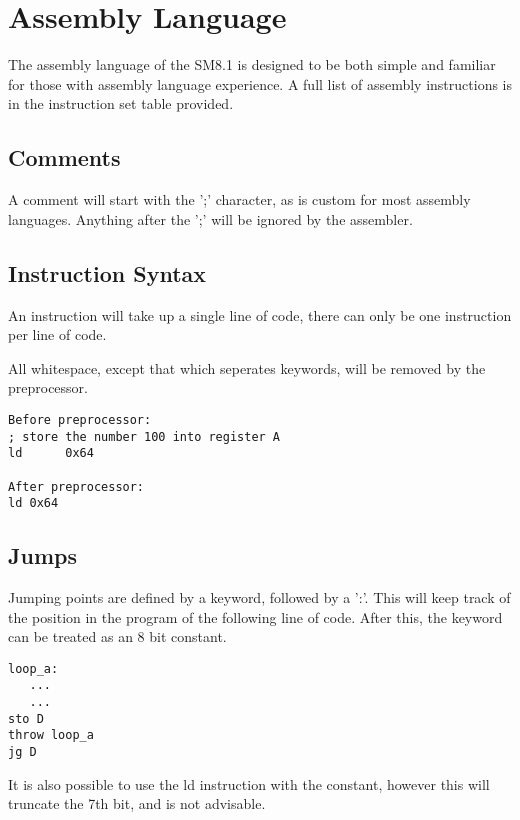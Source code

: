 \documentclass[11pt]{article}
\begin{document}
\section{Assembly Language}
The assembly language of the SM8.1 is designed to be both simple and familiar for those with assembly language experience. A full list of assembly instructions is in the instruction set table provided.
\newpage
\subsection{Comments}
A comment will start with the ';' character, as is custom for most assembly languages. Anything after the ';' will be ignored by the assembler.
\subsection{Instruction Syntax}
An instruction will take up a single line of code, there can only be one instruction per line of code.

All whitespace, except that which seperates keywords, will be removed by the preprocessor.
\begin{verbatim}
Before preprocessor:
; store the number 100 into register A
ld      0x64

After preprocessor:
ld 0x64
\end{verbatim}
\subsection{Jumps}
Jumping points are defined by a keyword, followed by a ':'. This will keep track of the position in the program of the following line of code. After this, the keyword can be treated as an 8 bit constant.
\begin{verbatim}
loop_a:
   ...
   ...
sto D
throw loop_a
jg D
\end{verbatim}
It is also possible to use the ld instruction with the constant, however this will truncate the 7th bit, and is not advisable.
\end{document}
